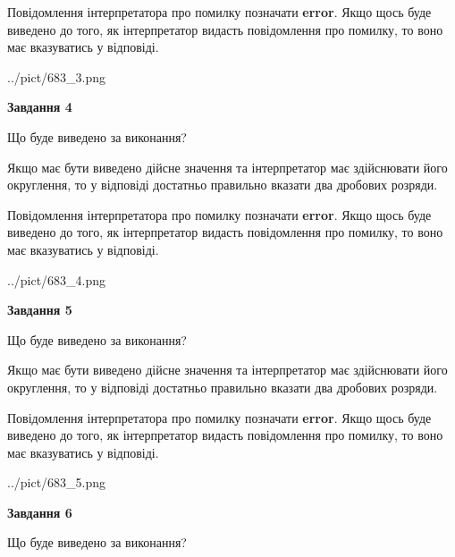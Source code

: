 \documentclass[12pt, ukrainian]{article}
\begin{document}
{\begin {Large}
Повідомлення інтерпретатора про помилку позначати \textbf{error}.
Якщо щось буде виведено до того, як інтерпретатор видасть повідомлення про помилку, 
то воно має вказуватись у відповіді. \par

\begin{center}
	{../pict/683_3.png}
\end{center}
\newpage

{\begin {center}\textbf{Завдання 4}\end {center}}\par
Що буде виведено за виконання? \par

Якщо має бути виведено дійсне значення та інтерпретатор має здійснювати його округлення, 
то у відповіді достатньо правильно вказати два дробових розряди.

Повідомлення інтерпретатора про помилку позначати \textbf{error}.
Якщо щось буде виведено до того, як інтерпретатор видасть повідомлення про помилку, 
то воно має вказуватись у відповіді. \par

\begin{center}
	{../pict/683_4.png}
\end{center}
\newpage

{\begin {center}\textbf{Завдання 5}\end {center}}\par
Що буде виведено за виконання? \par

Якщо має бути виведено дійсне значення та інтерпретатор має здійснювати його округлення, 
то у відповіді достатньо правильно вказати два дробових розряди.

Повідомлення інтерпретатора про помилку позначати \textbf{error}.
Якщо щось буде виведено до того, як інтерпретатор видасть повідомлення про помилку, 
то воно має вказуватись у відповіді. \par

\begin{center}
	{../pict/683_5.png}
\end{center}
\newpage

{\begin {center}\textbf{Завдання 6}\end {center}}\par
Що буде виведено за виконання? \par


\end{Large}}
\end{document}
